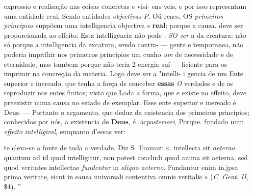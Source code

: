 expressio e realisação nas coisas concretas e visi- ens veis, e por isso representam uma entidade real, Sendo entidades \emph{objectivas P}. Oü reaes, OS \emph{primeiros principios} suppõem uma intelligencia objectiva e \textbf{real}; porque a causa. deve ser proporcionada ao elfeito. Esta intelligencia não pode : \emph{SO ser} a da creatura; não só porque a intelligencia da excatura, sendo contin- --- gente e temporanea, não poderia imprifhir nos primeiros principios um cunho \emph{um} de necessidade e de eternidade, mas tambem porque não teria 2 energia suf --- ficiente para os imprimir na concreção da materia. Logo deve ser a "intelli- i gencia de um Ente superior e increado, que tenha a força de conceber \textbf{essas} \emph{O} verdades e de as reproduzir nos entes finitos; visto que Loda a forma, que e existe no effeito, deve preexistir numa causa no estado de exemplar. Esse ente superior e inereado é Deus. --- Portanto o argamento, que deduz da existencia dos primeiros principios; conhecidos por nós, a existencia de \textbf{Deus}, é .\emph{arposteriori}, Porque. fundado num. \emph{effeito intelligivel}, emquanto d'essas ver:

te cleva-se a fonte de toda a verdade. Diz S. 1homaz: «. intellecta sit \emph{aeterna} quantum ad id quod intelligitur, non potest concludi quod anima sit aeterna, sed quod vcritates intellectae \emph{fundentur} in \emph{aliquo aeterno}. Fundantur enim in.jpsa prima veritate, sicut in eausa univorsali contentiva omnis veritalis » (\emph{C}. \emph{Gent}. \emph{II}, \$4). ”

